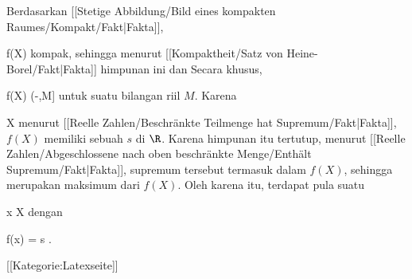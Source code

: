 Berdasarkan
[[Stetige Abbildung/Bild eines kompakten Raumes/Kompakt/Fakt|Fakta]],

\mavergleichskette
{\vergleichskette
{ f(X)
}
{ \subseteq }{ \R
}
{  }{
}
{    }{
}
{   }{
}
}
{}{}{}
kompak, sehingga menurut
[[Kompaktheit/Satz von Heine-Borel/Fakt|Fakta]]
himpunan ini
dan
Secara khusus,

\mavergleichskette
{\vergleichskette
{ f(X)
}
{ \subseteq }{ (-\infty,M]
}
{  }{
}
{    }{
}
{   }{
}
}
{}{}{}
untuk suatu bilangan riil $M$. Karena

\mavergleichskette
{\vergleichskette
{ X
}
{ \neq }{ \emptyset
}
{  }{
}
{    }{
}
{   }{
}
}
{}{}{}
menurut
[[Reelle Zahlen/Beschränkte Teilmenge hat Supremum/Fakt|Fakta]],
$f(X)$ memiliki sebuah
$s$ di $\R$. Karena himpunan itu tertutup, menurut [[Reelle Zahlen/Abgeschlossene nach oben beschränkte Menge/Enthält Supremum/Fakt|Fakta]],
supremum tersebut termasuk dalam $f(X)$, sehingga merupakan maksimum dari $f(X)$. Oleh karena itu, terdapat pula suatu

\mavergleichskette
{\vergleichskette
{ x
}
{ \in }{ X
}
{  }{
}
{    }{
}
{   }{
}
}
{}{}{}
dengan

\mavergleichskette
{\vergleichskette
{ f(x)
}
{ = }{ s
}
{  }{
}
{    }{
}
{   }{
}
}
{}{}{.}

 [[Kategorie:Latexseite]]
